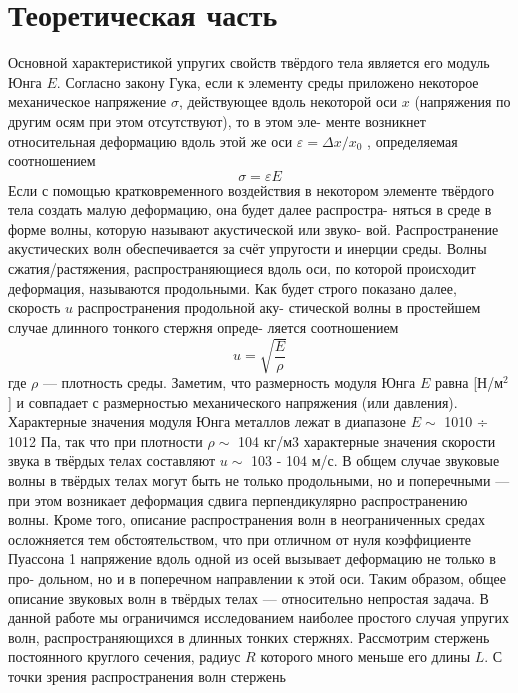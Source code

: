 \documentclass[a4, 12pt]{article}
\begin{document}
    \section{Теоретическая часть}
    Основной характеристикой упругих свойств твёрдого тела является его
модуль Юнга $E$. Согласно закону Гука, если к элементу среды приложено
некоторое механическое напряжение $\sigma$, действующее вдоль некоторой
оси $x$ (напряжения по другим осям при этом отсутствуют), то в этом эле-
менте возникнет относительная деформацию вдоль этой же оси
$\varepsilon = \Delta x/x_0$ , определяемая соотношением
\begin{equation}
    \sigma = \varepsilon E
\end{equation}
Если с помощью кратковременного воздействия в некотором элементе
твёрдого тела создать малую деформацию, она будет далее распростра-
няться в среде в форме волны, которую называют акустической или звуко-
вой. Распространение акустических волн обеспечивается за счёт упругости
и инерции среды. Волны сжатия/растяжения, распространяющиеся вдоль
оси, по которой происходит деформация, называются продольными. Как
будет строго показано далее, скорость $u$ распространения продольной аку-
стической волны в простейшем случае длинного тонкого стержня опреде-
ляется соотношением
\begin{equation}
    u = \sqrt{\frac{E}{\rho}}
\end{equation}
где $\rho$ — плотность среды.
Заметим, что размерность модуля Юнга $E$ равна [Н/м$^2$] и совпадает с
размерностью механического напряжения (или давления). Характерные
значения модуля Юнга металлов лежат в диапазоне $E\sim$ 1010 ÷ 1012 Па, так
что при плотности $\rho\sim$ 104 кг/м3 характерные значения скорости звука в
твёрдых телах составляют $u\sim$ 103 - 104 м/с.
В общем случае звуковые волны в твёрдых телах могут быть не только
продольными, но и поперечными — при этом возникает деформация сдвига
перпендикулярно распространению волны. Кроме того, описание распространения волн в неограниченных средах осложняется тем
обстоятельством, что при отличном от нуля коэффициенте Пуассона 1
напряжение вдоль одной из осей вызывает деформацию не только в про-
дольном, но и в поперечном направлении к этой оси. Таким образом, общее
описание звуковых волн в твёрдых телах — относительно непростая задача.
В данной работе мы ограничимся исследованием наиболее простого случая
упругих волн, распространяющихся в длинных тонких стержнях.
Рассмотрим стержень постоянного круглого сечения, радиус $R$ которого
много меньше его длины $L$. С точки зрения распространения волн стержень
\end{document}

